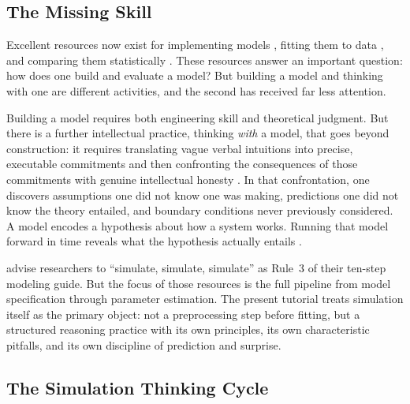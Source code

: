 \documentclass[fleqn,10pt]{wlscirep}
\begin{document}
\begin{linenumbers}
\subsection*{The Missing Skill}

Excellent resources now exist for implementing models \citep{wilson2019ten, heathcote2015introduction}, fitting them to data \citep{farrell2018computational, lee2013bayesian}, and comparing them statistically \citep{wagenmakers2004aic, myung2003tutorial}. These resources answer an important question: how does one build and evaluate a model? But building a model and thinking with one are different activities, and the second has received far less attention.

Building a model requires both engineering skill and theoretical judgment. But there is a further intellectual practice, thinking \emph{with} a model, that goes beyond construction: it requires translating vague verbal intuitions into precise, executable commitments and then confronting the consequences of those commitments with genuine intellectual honesty \citep{guest2021computational, vanrooij2021theory, smaldino2020translate}. In that confrontation, one discovers assumptions one did not know one was making, predictions one did not know the theory entailed, and boundary conditions never previously considered. A model encodes a hypothesis about how a system works. Running that model forward in time reveals what the hypothesis actually entails \citep{lewandowsky1993role, mcclelland2009place}.

\citet{wilson2019ten} advise researchers to ``simulate, simulate, simulate'' as Rule~3 of their ten-step modeling guide. But the focus of those resources is the full pipeline from model specification through parameter estimation. The present tutorial treats simulation itself as the primary object: not a preprocessing step before fitting, but a structured reasoning practice with its own principles, its own characteristic pitfalls, and its own discipline of prediction and surprise.

\subsection*{The Simulation Thinking Cycle}


\end{linenumbers}
\end{document}
